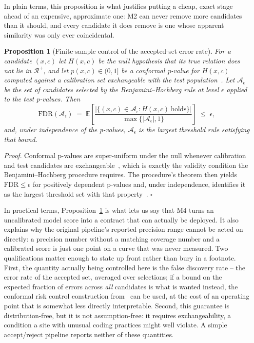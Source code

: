 \documentclass[conference]{IEEEtran}
\newcommand{\att}{\mathcal{A}}
\newtheorem{proposition}{Proposition}
\begin{document}
In plain terms, this proposition is what justifies putting a cheap, exact stage ahead of an expensive, approximate one: M2 can never remove more candidates than it should, and every candidate it does remove is one whose apparent similarity was only ever coincidental.

\begin{proposition}[Finite-sample control of the accepted-set error rate]
\label{prop:conformal}
For a candidate $(x,c)$ let $H(x,c)$ be the null hypothesis that its true relation does not lie in $\mathcal{R}^{+}$, and let $p(x,c) \in (0,1]$ be a conformal p-value for $H(x,c)$ computed against a calibration set exchangeable with the test population~\cite{b50,b52}. Let $\att_\epsilon$ be the set of candidates selected by the Benjamini--Hochberg rule at level $\epsilon$ applied to the test p-values. Then
\begin{equation}
\mathrm{FDR}(\att_\epsilon)
\;=\;
\mathbb{E}\!\left[
\frac{\big|\{(x,c) \in \att_\epsilon : H(x,c)\ \text{holds}\}\big|}{\max\{|\att_\epsilon|,1\}}
\right]
\;\le\; \epsilon ,
\end{equation}
and, under independence of the p-values, $\att_\epsilon$ is the largest threshold rule satisfying that bound.
\end{proposition}

\noindent\textit{Proof.} Conformal p-values are super-uniform under the null whenever calibration and test candidates are exchangeable~\cite{b50}, which is exactly the validity condition the Benjamini--Hochberg procedure requires. The procedure's theorem then yields $\mathrm{FDR} \le \epsilon$ for positively dependent p-values and, under independence, identifies it as the largest threshold set with that property~\cite{b53}. \hfill$\square$

In practical terms, Proposition~\ref{prop:conformal} is what lets us say that M4 turns an uncalibrated model score into a contract that can actually be deployed. It also explains why the original pipeline's reported precision range cannot be acted on directly: a precision number without a matching coverage number and a calibrated score is just one point on a curve that was never measured. Two qualifications matter enough to state up front rather than bury in a footnote. First, the quantity actually being controlled here is the false discovery rate -- the error rate of the accepted set, averaged over selections; if a bound on the expected fraction of errors across \emph{all} candidates is what is wanted instead, the conformal risk control construction from~\cite{b22} can be used, at the cost of an operating point that is somewhat less directly interpretable. Second, this guarantee is distribution-free, but it is not assumption-free: it requires exchangeability, a condition a site with unusual coding practices might well violate. A simple accept/reject pipeline reports neither of these quantities.
\end{document}
